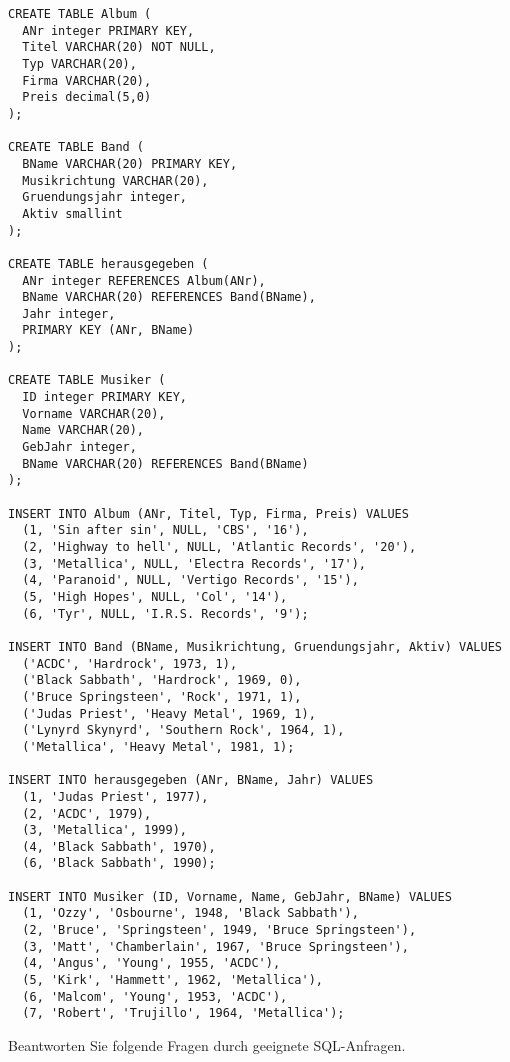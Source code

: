 \documentclass{bschlangaul-aufgabe}
\begin{document}
\begin{verbatim}
CREATE TABLE Album (
  ANr integer PRIMARY KEY,
  Titel VARCHAR(20) NOT NULL,
  Typ VARCHAR(20),
  Firma VARCHAR(20),
  Preis decimal(5,0)
);

CREATE TABLE Band (
  BName VARCHAR(20) PRIMARY KEY,
  Musikrichtung VARCHAR(20),
  Gruendungsjahr integer,
  Aktiv smallint
);

CREATE TABLE herausgegeben (
  ANr integer REFERENCES Album(ANr),
  BName VARCHAR(20) REFERENCES Band(BName),
  Jahr integer,
  PRIMARY KEY (ANr, BName)
);

CREATE TABLE Musiker (
  ID integer PRIMARY KEY,
  Vorname VARCHAR(20),
  Name VARCHAR(20),
  GebJahr integer,
  BName VARCHAR(20) REFERENCES Band(BName)
);

INSERT INTO Album (ANr, Titel, Typ, Firma, Preis) VALUES
  (1, 'Sin after sin', NULL, 'CBS', '16'),
  (2, 'Highway to hell', NULL, 'Atlantic Records', '20'),
  (3, 'Metallica', NULL, 'Electra Records', '17'),
  (4, 'Paranoid', NULL, 'Vertigo Records', '15'),
  (5, 'High Hopes', NULL, 'Col', '14'),
  (6, 'Tyr', NULL, 'I.R.S. Records', '9');

INSERT INTO Band (BName, Musikrichtung, Gruendungsjahr, Aktiv) VALUES
  ('ACDC', 'Hardrock', 1973, 1),
  ('Black Sabbath', 'Hardrock', 1969, 0),
  ('Bruce Springsteen', 'Rock', 1971, 1),
  ('Judas Priest', 'Heavy Metal', 1969, 1),
  ('Lynyrd Skynyrd', 'Southern Rock', 1964, 1),
  ('Metallica', 'Heavy Metal', 1981, 1);

INSERT INTO herausgegeben (ANr, BName, Jahr) VALUES
  (1, 'Judas Priest', 1977),
  (2, 'ACDC', 1979),
  (3, 'Metallica', 1999),
  (4, 'Black Sabbath', 1970),
  (6, 'Black Sabbath', 1990);

INSERT INTO Musiker (ID, Vorname, Name, GebJahr, BName) VALUES
  (1, 'Ozzy', 'Osbourne', 1948, 'Black Sabbath'),
  (2, 'Bruce', 'Springsteen', 1949, 'Bruce Springsteen'),
  (3, 'Matt', 'Chamberlain', 1967, 'Bruce Springsteen'),
  (4, 'Angus', 'Young', 1955, 'ACDC'),
  (5, 'Kirk', 'Hammett', 1962, 'Metallica'),
  (6, 'Malcom', 'Young', 1953, 'ACDC'),
  (7, 'Robert', 'Trujillo', 1964, 'Metallica');
\end{verbatim}

\noindent
Beantworten Sie folgende Fragen durch geeignete SQL-Anfragen.
\end{document}
